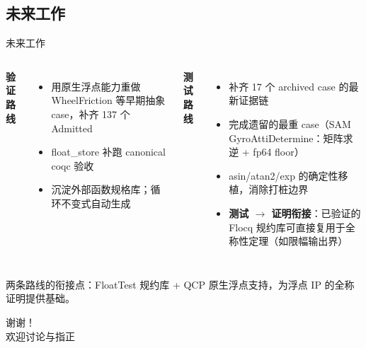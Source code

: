\documentclass[UTF8,aspectratio=169]{ctexbeamer}
\begin{document}
\subsection{未来工作}
\begin{frame}{未来工作}
  \begin{columns}[T]
    \textbf{验证路线}
    \begin{itemize}\small
      \item 用原生浮点能力重做 WheelFriction 等早期抽象 case，补齐 137 个 Admitted
      \item float\_store 补跑 canonical coqc 验收
      \item 沉淀外部函数规格库；循环不变式自动生成
    \end{itemize}
    \textbf{测试路线}
    \begin{itemize}\small
      \item 补齐 17 个 archived case 的最新证据链
      \item 完成遗留的最重 case（SAM GyroAttiDetermine：矩阵求逆 + fp64 floor）
      \item asin/atan2/exp 的确定性移植，消除打桩边界
      \item \textbf{测试 $\to$ 证明衔接}：已验证的 Flocq 规约库可直接复用于全称性定理（如限幅输出界）
    \end{itemize}
  \end{columns}
  \vspace{1em}
  \centering\small
  两条路线的衔接点：FloatTest 规约库 + QCP 原生浮点支持，为浮点 IP 的全称证明提供基础。
\end{frame}

\begin{frame}
  \centering
  {\Huge 谢谢！}\\[1.5em]
  {\large 欢迎讨论与指正}
\end{frame}
\end{document}
